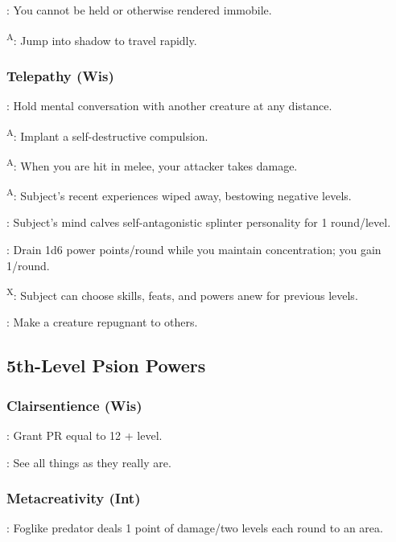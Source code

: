 : You cannot be held or otherwise rendered immobile.

\textsuperscript{A}: Jump into shadow to travel rapidly.


\subsubsection{Telepathy (Wis)}

: Hold mental conversation with another creature at any distance.

\textsuperscript{A}: Implant a self-destructive compulsion.

\textsuperscript{A}: When you are hit in melee, your attacker takes damage.

\textsuperscript{A}: Subject's recent experiences wiped away, bestowing negative levels.

: Subject's mind calves self-antagonistic splinter personality for 1 round/level.

: Drain 1d6 power points/round while you maintain concentration; you gain 1/round.

\textsuperscript{X}: Subject can choose skills, feats, and powers anew for previous levels.

: Make a creature repugnant to others.



\subsection{5th-Level Psion Powers}


\subsubsection{Clairsentience (Wis)}

: Grant PR equal to 12 + level.

: See all things as they really are.


\subsubsection{Metacreativity (Int)}

: Foglike predator deals 1 point of damage/two levels each round to an area.


